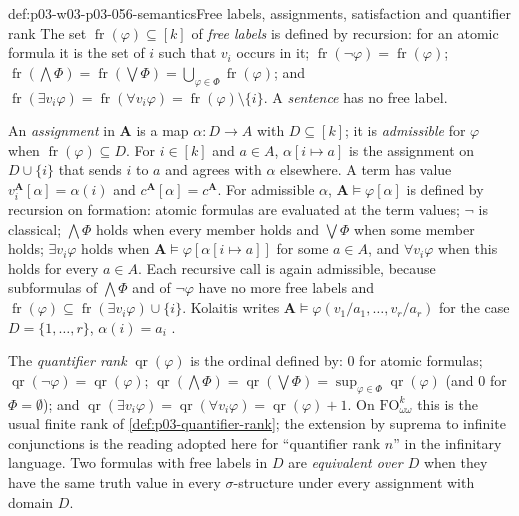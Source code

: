 \begin{hbdefinition}{def:p03-w03-p03-056-semantics}{Free labels, assignments, satisfaction and quantifier rank}
The set \(\operatorname{fr}(\varphi)\subseteq[k]\) of \emph{free labels} is
defined by recursion: for an atomic formula it is the set of \(i\) such that
\(v_i\) occurs in it; \(\operatorname{fr}(\neg\varphi)=\operatorname{fr}(\varphi)\);
\(\operatorname{fr}(\bigwedge\Phi)=\operatorname{fr}(\bigvee\Phi)=
\bigcup_{\varphi\in\Phi}\operatorname{fr}(\varphi)\); and
\(\operatorname{fr}(\exists v_i\varphi)=\operatorname{fr}(\forall v_i\varphi)=
\operatorname{fr}(\varphi)\setminus\{i\}\). A \emph{sentence} has no free label.

An \emph{assignment} in \(\mathbf A\) is a map \(\alpha:D\to A\) with
\(D\subseteq[k]\); it is \emph{admissible} for \(\varphi\) when
\(\operatorname{fr}(\varphi)\subseteq D\). For \(i\in[k]\) and \(a\in A\),
\(\alpha[i\mapsto a]\) is the assignment on \(D\cup\{i\}\) that sends \(i\)
to \(a\) and agrees with \(\alpha\) elsewhere. A term has value
\(v_i^{\mathbf A}[\alpha]=\alpha(i)\) and \(c^{\mathbf A}[\alpha]=c^{\mathbf A}\).
For admissible \(\alpha\), \(\mathbf A\models\varphi[\alpha]\) is defined by
recursion on formation: atomic formulas are evaluated at the term values;
\(\neg\) is classical; \(\bigwedge\Phi\) holds when every member holds and
\(\bigvee\Phi\) when some member holds; \(\exists v_i\varphi\) holds when
\(\mathbf A\models\varphi[\alpha[i\mapsto a]]\) for some \(a\in A\), and
\(\forall v_i\varphi\) when this holds for every \(a\in A\). Each recursive
call is again admissible, because subformulas of \(\bigwedge\Phi\) and of
\(\neg\varphi\) have no more free labels and
\(\operatorname{fr}(\varphi)\subseteq\operatorname{fr}(\exists v_i\varphi)\cup\{i\}\).
Kolaitis writes \(\mathbf A\models\varphi(v_1/a_1,\ldots,v_r/a_r)\) for the
case \(D=\{1,\ldots,r\}\), \(\alpha(i)=a_i\)
\cite[Def.~7.8, p.~57]{Kolaitis2003ExpressivePowerNotes}.

The \emph{quantifier rank} \(\operatorname{qr}(\varphi)\) is the ordinal
defined by: \(0\) for atomic formulas;
\(\operatorname{qr}(\neg\varphi)=\operatorname{qr}(\varphi)\);
\(\operatorname{qr}(\bigwedge\Phi)=\operatorname{qr}(\bigvee\Phi)=
\sup_{\varphi\in\Phi}\operatorname{qr}(\varphi)\) (and \(0\) for
\(\Phi=\emptyset\)); and
\(\operatorname{qr}(\exists v_i\varphi)=\operatorname{qr}(\forall v_i\varphi)=
\operatorname{qr}(\varphi)+1\). On \(\mathrm{FO}^k_{\omega\omega}\) this is
the usual finite rank of \cref{def:p03-quantifier-rank}; the extension by
suprema to infinite conjunctions is the reading adopted here for ``quantifier
rank \(n\)'' in the infinitary language. Two formulas with free labels in
\(D\) are \emph{equivalent over \(D\)} when they have the same truth value
in every \(\sigma\)-structure under every assignment with domain \(D\).
\end{hbdefinition}

